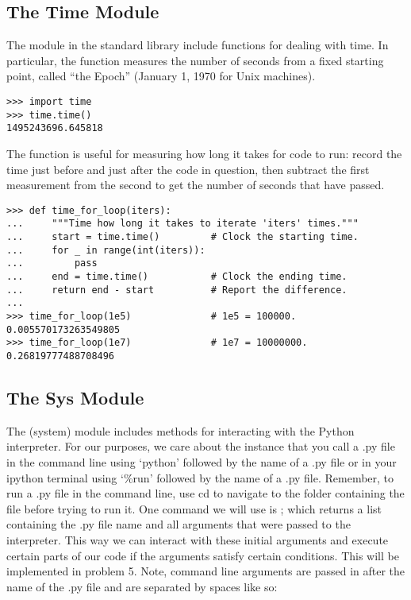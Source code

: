 \subsection*{The Time Module} %

The  module in the standard library include functions for dealing with time.
In particular, the  function measures the number of seconds from a fixed starting point, called ``the Epoch'' (January 1, 1970 for Unix machines).

\begin{lstlisting}
>>> import time
>>> time.time()
1495243696.645818
\end{lstlisting}

The  function
is useful for measuring how long it takes for code to run: record the time just before and just after the code in question, then subtract the first measurement from the second to get the number of seconds that have passed.

\begin{lstlisting}
>>> def time_for_loop(iters):
...     """Time how long it takes to iterate 'iters' times."""
...     start = time.time()         # Clock the starting time.
...     for _ in range(int(iters)):
...         pass
...     end = time.time()           # Clock the ending time.
...     return end - start          # Report the difference.
...
>>> time_for_loop(1e5)              # 1e5 = 100000.
0.005570173263549805
>>> time_for_loop(1e7)              # 1e7 = 10000000.
0.26819777488708496
\end{lstlisting}

\subsection*{The Sys Module} %

The  (system) module includes methods for interacting with the Python interpreter. For our purposes, we care about the instance that you call a .py file in the command line using `python' followed by the name of a .py file or in your ipython terminal  using `\%run' followed by the name of a .py file. Remember, to run a .py file in the command line, use cd to navigate to the folder containing the file before trying to run it. One command we will use is ; which returns a list containing the .py file name and all arguments that were passed to the interpreter. This way we can interact with these initial arguments and execute certain parts of our code if the arguments satisfy certain conditions. This will be implemented in problem 5. Note, command line arguments are passed in after the name of the .py file and are separated by spaces like so:

